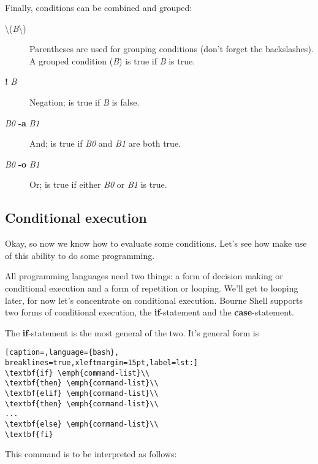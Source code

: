 Finally, conditions can be combined and grouped:
\begin{description}
	\item[\textbackslash{}(\emph{B}\textbackslash{})] Parentheses are used for
grouping conditions (don't forget the backslashes). A grouped condition
(\emph{B}) is true if \emph{B} is true.
	\item[\textbf{!} \emph{B}] Negation; is true if \emph{B} is false.
	\item[\emph{B0} \textbf{-a} \emph{B1}] And; is true if \emph{B0} and
\emph{B1} are both true.
	\item[\emph{B0} \textbf{-o} \emph{B1}] Or; is true if either \emph{B0} or
\emph{B1} is true.
\end{description}

\subsection{Conditional execution}
Okay, so now we know how to evaluate some conditions. Let's see how make use of
this ability to do some programming.

All programming languages need two things: a form of decision making or
conditional execution and a form of repetition or looping. We'll get to looping
later, for now let's concentrate on conditional execution. Bourne Shell
supports two forms of conditional execution, the \textbf{if}-statement and the
\textbf{case}-statement.

The \textbf{if}-statement is the most general of the two. It's general form is

\lstset{basicstyle=\scriptsize, numbers=left, captionpos=b, tabsize=4}
\begin{lstlisting}[caption=,language={bash},
breaklines=true,xleftmargin=15pt,label=lst:]
\textbf{if} \emph{command-list}\\
\textbf{then} \emph{command-list}\\
\textbf{elif} \emph{command-list}\\
\textbf{then} \emph{command-list}\\
...
\textbf{else} \emph{command-list}\\
\textbf{fi}
\end{lstlisting}

This command is to be interpreted as follows:

